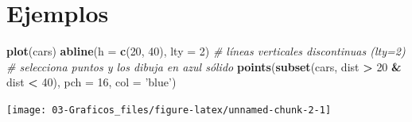 \documentclass[]{book}
\newenvironment{Shaded}{\begin{snugshade}}{\end{snugshade}}
\newcommand{\CommentTok}[1]{\textcolor[rgb]{0.56,0.35,0.01}{\textit{#1}}}
\newcommand{\DataTypeTok}[1]{\textcolor[rgb]{0.13,0.29,0.53}{#1}}
\newcommand{\DecValTok}[1]{\textcolor[rgb]{0.00,0.00,0.81}{#1}}
\newcommand{\KeywordTok}[1]{\textcolor[rgb]{0.13,0.29,0.53}{\textbf{#1}}}
\newcommand{\NormalTok}[1]{#1}
\newcommand{\OperatorTok}[1]{\textcolor[rgb]{0.81,0.36,0.00}{\textbf{#1}}}
\newcommand{\StringTok}[1]{\textcolor[rgb]{0.31,0.60,0.02}{#1}}
\begin{document}
\hypertarget{ejemplos-1}{%
\section{Ejemplos}\label{ejemplos-1}}

\begin{Shaded}
\begin{Highlighting}[]
\KeywordTok{plot}\NormalTok{(cars)}
\KeywordTok{abline}\NormalTok{(}\DataTypeTok{h =} \KeywordTok{c}\NormalTok{(}\DecValTok{20}\NormalTok{, }\DecValTok{40}\NormalTok{), }\DataTypeTok{lty =} \DecValTok{2}\NormalTok{) }\CommentTok{# líneas verticales discontinuas (lty=2)}
\CommentTok{# selecciona puntos y los dibuja en azul sólido}
\KeywordTok{points}\NormalTok{(}\KeywordTok{subset}\NormalTok{(cars, dist }\OperatorTok{>}\StringTok{ }\DecValTok{20} \OperatorTok{&}\StringTok{ }\NormalTok{dist }\OperatorTok{<}\StringTok{ }\DecValTok{40}\NormalTok{), }\DataTypeTok{pch =} \DecValTok{16}\NormalTok{, }\DataTypeTok{col =} \StringTok{'blue'}\NormalTok{) }
\end{Highlighting}
\end{Shaded}

\begin{center}\texttt{[image: 03-Graficos\_files/figure-latex/unnamed-chunk-2-1]} \end{center}
\end{document}
